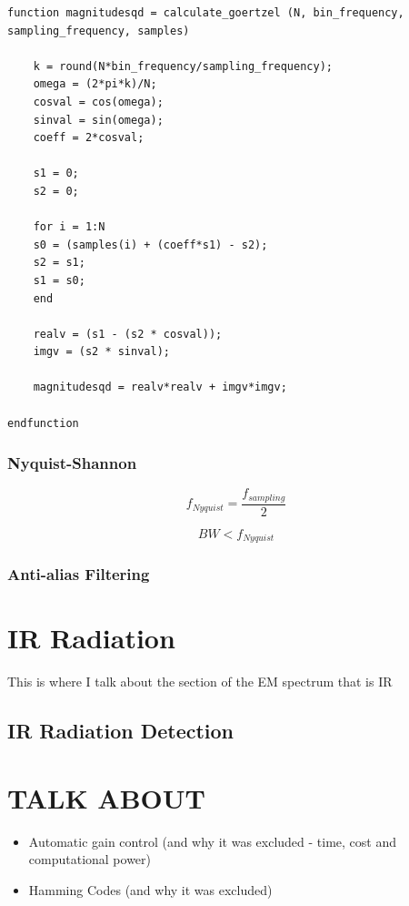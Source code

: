 \begin{lstlisting}[caption={Goertzel Algorithm - Octave Implementation\label{lst:goertzel_algorithm}}]
function magnitudesqd = calculate_goertzel (N, bin_frequency, sampling_frequency, samples)

	k = round(N*bin_frequency/sampling_frequency);
	omega = (2*pi*k)/N;
	cosval = cos(omega);
	sinval = sin(omega);
	coeff = 2*cosval;
	
	s1 = 0;
	s2 = 0;
	
	for i = 1:N
	s0 = (samples(i) + (coeff*s1) - s2);
	s2 = s1;
	s1 = s0;    
	end
	
	realv = (s1 - (s2 * cosval));
	imgv = (s2 * sinval);  
	
	magnitudesqd = realv*realv + imgv*imgv;

endfunction
\end{lstlisting}

\subsubsection{Nyquist-Shannon}

\[f_{Nyquist} = \frac{f_{sampling}}{2}\]

\begin{equation}
\label{eqn:sampling_frequency}
BW < f_{Nyquist}
\end{equation}


\subsubsection{Anti-alias Filtering}




\section{IR Radiation}
This is where I talk about the section of the EM spectrum that is IR


\subsection{IR Radiation Detection}





\section{TALK ABOUT}
\begin{itemize}
	\item Automatic gain control (and why it was excluded - time, cost and computational power)
	\item Hamming Codes (and why it was excluded)
\end{itemize}







